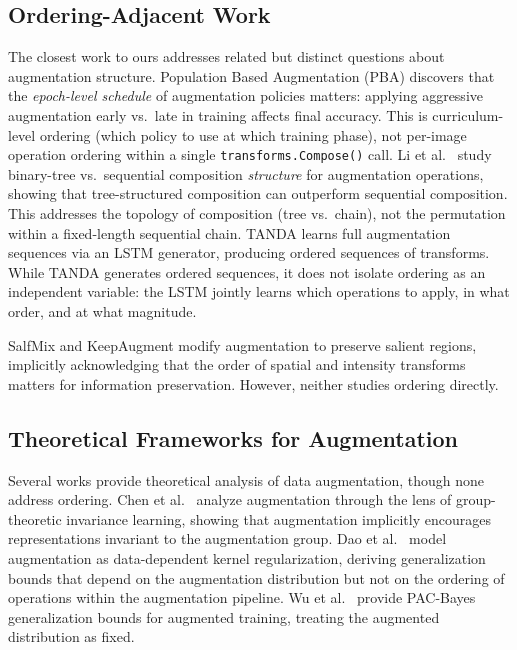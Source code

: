 \documentclass{article}
\begin{document}
\subsection{Ordering-Adjacent Work}

The closest work to ours addresses related but distinct questions about augmentation structure. Population Based Augmentation (PBA) \cite{ho2019pba} discovers that the \emph{epoch-level schedule} of augmentation policies matters: applying aggressive augmentation early vs.\ late in training affects final accuracy. This is curriculum-level ordering (which policy to use at which training phase), not per-image operation ordering within a single \texttt{transforms.Compose()} call. Li et al.\ \cite{li2024treeaug} study binary-tree vs.\ sequential composition \emph{structure} for augmentation operations, showing that tree-structured composition can outperform sequential composition. This addresses the topology of composition (tree vs.\ chain), not the permutation within a fixed-length sequential chain. TANDA \cite{ratner2017tanda} learns full augmentation sequences via an LSTM generator, producing ordered sequences of transforms. While TANDA generates ordered sequences, it does not isolate ordering as an independent variable: the LSTM jointly learns which operations to apply, in what order, and at what magnitude.

SalfMix \cite{choi2022salfmix} and KeepAugment \cite{gong2021keepaugment} modify augmentation to preserve salient regions, implicitly acknowledging that the order of spatial and intensity transforms matters for information preservation. However, neither studies ordering directly.

\subsection{Theoretical Frameworks for Augmentation}

Several works provide theoretical analysis of data augmentation, though none address ordering. Chen et al.\ \cite{chen2020group} analyze augmentation through the lens of group-theoretic invariance learning, showing that augmentation implicitly encourages representations invariant to the augmentation group. Dao et al.\ \cite{dao2019kernel} model augmentation as data-dependent kernel regularization, deriving generalization bounds that depend on the augmentation distribution but not on the ordering of operations within the augmentation pipeline. Wu et al.\ \cite{wu2020generalization} provide PAC-Bayes generalization bounds for augmented training, treating the augmented distribution as fixed.
\end{document}
